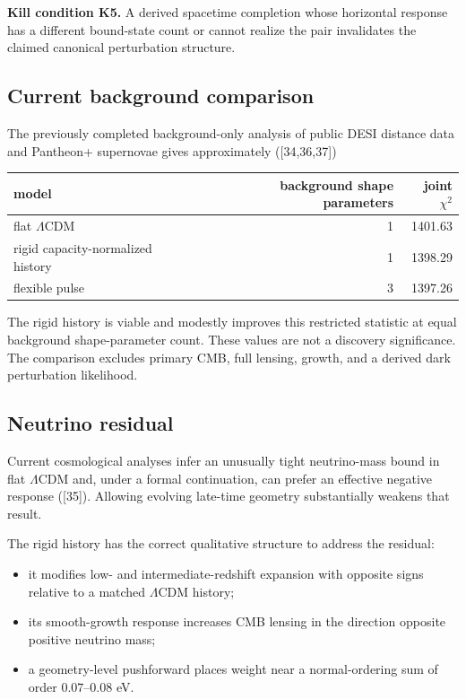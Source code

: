 \documentclass[
  11pt,
  letterpaper,
]{article}
\providecommand{\tightlist}{%
  \setlength{\itemsep}{0pt}\setlength{\parskip}{0pt}}
\begin{document}
\textbf{Kill condition K5.} A derived spacetime completion whose
horizontal response has a different bound-state count or cannot realize
the pair invalidates the claimed canonical perturbation structure.

\subsection{Current background
comparison}\label{current-background-comparison}

The previously completed background-only analysis of public DESI
distance data and Pantheon+ supernovae gives approximately
({[}34,36,37{]})

\begin{longtable}[]{@{}lrr@{}}
\toprule\noalign{}
model & background shape parameters & joint \(\chi^2\) \\
\midrule\noalign{}
\endhead
\bottomrule\noalign{}
\endlastfoot
flat \(\Lambda\)CDM & 1 & 1401.63 \\
rigid capacity-normalized history & 1 & 1398.29 \\
flexible pulse & 3 & 1397.26 \\
\end{longtable}

The rigid history is viable and modestly improves this restricted
statistic at equal background shape-parameter count. These values are
not a discovery significance. The comparison excludes primary CMB, full
lensing, growth, and a derived dark perturbation likelihood.

\subsection{Neutrino residual}\label{neutrino-residual}

Current cosmological analyses infer an unusually tight neutrino-mass
bound in flat \(\Lambda\)CDM and, under a formal continuation, can
prefer an effective negative response ({[}35{]}). Allowing evolving
late-time geometry substantially weakens that result.

The rigid history has the correct qualitative structure to address the
residual:

\begin{itemize}
\tightlist
\item
  it modifies low- and intermediate-redshift expansion with opposite
  signs relative to a matched \(\Lambda\)CDM history;
\item
  its smooth-growth response increases CMB lensing in the direction
  opposite positive neutrino mass;
\item
  a geometry-level pushforward places weight near a normal-ordering sum
  of order \(0.07\)--\(0.08\) eV.
\end{itemize}
\end{document}
